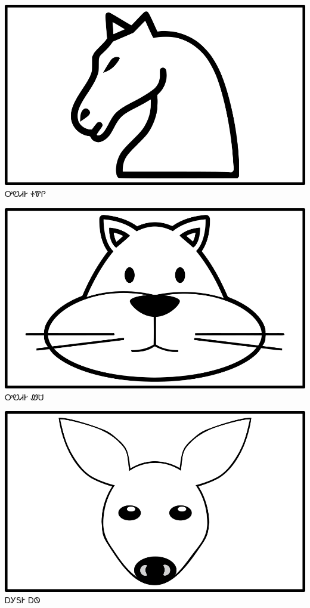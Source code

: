 \documentclass[avery5371]{flashcards}%
\begin{document}
\begin{flashcard}{
\includegraphics[width=0.95\columnwidth,height=.51\columnwidth,keepaspectratio]{../artwork/objects-animate/soquili}
}\Huge ᎤᏬᏗᎨ ᏐᏈᎵ
\end{flashcard}

\begin{flashcard}{
\includegraphics[width=0.95\columnwidth,height=.51\columnwidth,keepaspectratio]{../artwork/objects-animate/wesa}
}\Huge ᎤᏬᏗᎨ ᏪᏌ
\end{flashcard}

\begin{flashcard}{
\includegraphics[width=0.95\columnwidth,height=.51\columnwidth,keepaspectratio]{../artwork/objects-animate/ahwi}
}\Huge ᎠᎩᎦᎨ ᎠᏫ
\end{flashcard}
\end{document}
